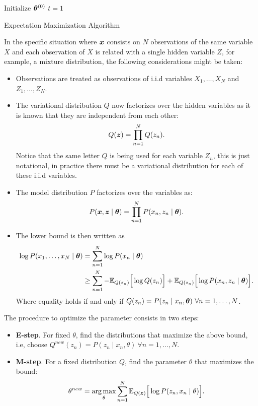  \begin{algorithm}[t]
  \SetAlgoLined{}
  Initialize \(\bm{\theta}^{(0)}\)\;
  \(t=1\)\;
  \KwRet{\(\theta\)}\;
  \caption{Expectation Maximization Algorithm}\label{alg:em}
\end{algorithm}

In the specific situation where \(\bm{x}\) consists on \(N\) observations of the same variable \(X\) and each observation of \(X\) is related with a single hidden variable \(Z\), for example, a mixture distribution, the following considerations might be taken:
\begin{itemize}\setlength{\itemsep}{0.2cm}
  \item Observations are treated as observations of i.i.d variables \(X_{1},\dots, X_{N}\) and \(Z_{1},\dots,Z_{N}\).
  \item The variational distribution \(Q\) now factorizes over the hidden variables as it is known that they are independent from each other:
    \[
    Q(\bm{z}) = \prod_{n=1}^{N}Q(z_{n}).
    \]
    Notice that the same letter \(Q\) is being used for each variable \(Z_{n}\), this is just notational, in practice there must be a variational distribution for each of these i.i.d variables.
  \item The model distribution \(P\) factorizes over the variables as:
    \[
    P(\bm{x}, \bm{z} \mid \bm{\theta}) = \prod_{n=1}^{N}P(x_{n}, z_{n} \mid \bm{\theta}).
    \]
  \item The lower bound is then written as
    \[
    \begin{aligned}
      \log{P(x_{1},\dots,x_{N} \mid \bm{\theta})} &= \sum_{n=1}^{N}\log{P(x_{n} \mid \bm{\theta})}\\
      &\geq \sum_{n = 1}^{N} -\mathbb{E}_{Q(z_{n})}\Big[\log{Q(z_{n})}\Big] + \mathbb{E}_{Q(z_{n})}\Big[\log{P(x_{n},z_{n} \mid \bm{\theta})}\Big].
    \end{aligned}
    \]
    Where equality holds if and only if \(Q(z_{n}) = P(z_{n} \mid x_{n} , \bm{\theta}) \ \forall n=1, \dots, N\).
\end{itemize}

The procedure to optimize the parameter consists in two steps:
\begin{itemize}\setlength{\itemsep}{0.2cm}
  \item \textbf{E-step}. For fixed \(\theta\), find the distributions that maximize the above bound, i.e, choose \(Q^{new}(z_{n}) = P(z_{n} \mid x_{n} , \theta) \ \forall n = 1,\dots,N\).
  \item \textbf{M-step}. For a fixed distribution \(Q\), find the parameter \(\theta\) that maximizes the bound:
    \[
    \theta^{new} = \operatorname*{arg\,max}_{\theta}\sum_{n=1}^{N}\mathbb{E}_{Q(\bm{z})}\Big[\log{P(z_{n}, x_{n} \mid \theta)}\Big].
    \]
\end{itemize}

